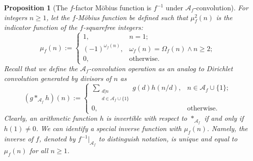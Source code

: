 \documentclass[11pt,reqno,a4letter]{article}
\numberwithin{figure}{section}
\numberwithin{table}{section}
\theoremstyle{plain}
\newtheorem{prop}[theorem]{Proposition}
\numberwithin{theorem}{section}
\theoremstyle{definition}
\begin{document}
\begin{prop}[The $f$-factor M\"obius function is $f^{-1}$ under $\mathcal{A}_f$-convolution]
\label{prop_mufnEQfInvn_justification_v1}
For integers $n \geq 1$, let the $f$-M\"obius function be defined such that 
$\mu_f^2(n)$ is the indicator function of the $f$-squarefree integers: 
\[
\mu_f(n) := \begin{cases}
     1, & n = 1; \\ 
     (-1)^{\omega_f(n)}, & \omega_f(n) = \Omega_f(n) \wedge n \geq 2; \\ 
     0, & \mathrm{otherwise.}
     \end{cases}
\]
Recall that we define the $\mathcal{A}_f$-convolution operation 
as an analog to Dirichlet convolution generated by divisors of $n$ as 
\[
(g \ast_{\mathcal{A}_f} h)(n) := \begin{cases}
     \sum\limits_{\substack{d|n \\ d \in \mathcal{A}_f \cup \{1\}}} 
          g(d) h(n/d), & n \in \mathcal{A}_f \cup \{1\}; \\ 
     0, & \mathrm{otherwise.}
     \end{cases}
\]
Clearly, an arithmetic function $h$ is invertible with respect to 
$\ast_{\mathcal{A}_f}$ if and only if $h(1) \neq 0$. 
We can identify a special inverse function with $\mu_f(n)$. 
Namely, the inverse of $f$, denoted by $f^{-1}\bigr\rvert_{\mathcal{A}_f}$ to 
distinguish notation, is unique and equal to $\mu_f(n)$ for all $n \geq 1$. 
\end{prop}
\end{document}
